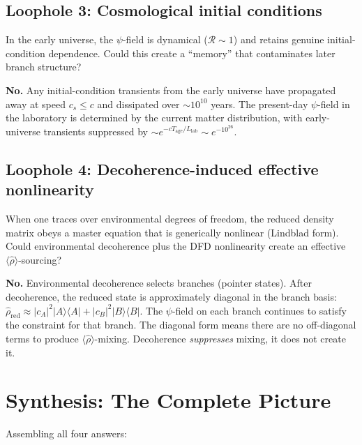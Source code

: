 \documentclass[12pt,a4paper]{article}
\begin{document}
\subsection{Loophole 3: Cosmological initial conditions}

In the early universe, the $\psi$-field is dynamical ($\mathcal{R} \sim 1$)
and retains genuine initial-condition dependence. Could this create a
``memory'' that contaminates later branch structure?

\textbf{No.} Any initial-condition transients from the early universe
have propagated away at speed $c_s \leq c$ and dissipated over
$\sim 10^{10}$ years. The present-day $\psi$-field in the laboratory
is determined by the current matter distribution, with early-universe
transients suppressed by $\sim e^{-cT_\mathrm{age}/L_\mathrm{lab}}
\sim e^{-10^{26}}$.

\subsection{Loophole 4: Decoherence-induced effective nonlinearity}

When one traces over environmental degrees of freedom, the reduced
density matrix obeys a master equation that is generically nonlinear
(Lindblad form). Could environmental decoherence plus the DFD nonlinearity
create an effective $\langle\hat\rho\rangle$-sourcing?

\textbf{No.} Environmental decoherence selects branches (pointer states).
After decoherence, the reduced state is approximately diagonal in the
branch basis: $\hat\rho_\mathrm{red} \approx |c_A|^2|A\rangle\langle A|
+ |c_B|^2|B\rangle\langle B|$. The $\psi$-field on each branch continues
to satisfy the constraint for that branch. The diagonal form means there
are no off-diagonal terms to produce $\langle\hat\rho\rangle$-mixing.
Decoherence \emph{suppresses} mixing, it does not create it.


\section{Synthesis: The Complete Picture}
\label{sec:synthesis}

Assembling all four answers:
\end{document}
